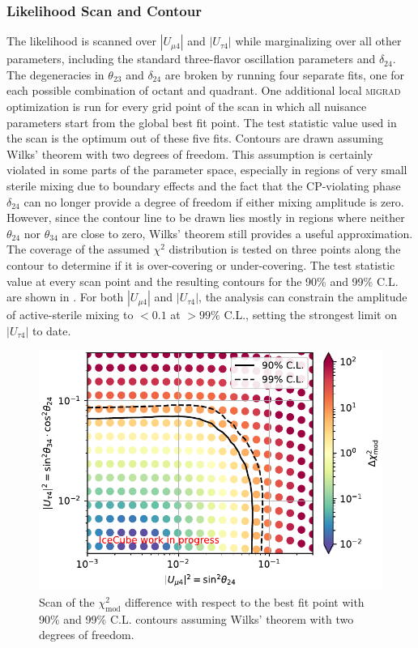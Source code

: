 \subsubsection{Likelihood Scan and Contour}
The likelihood is scanned over $|U_{\mu 4}|$ and $|U_{\tau 4}|$ while marginalizing over all other parameters, including the standard three-flavor oscillation parameters and $\delta_{24}$. The degeneracies in $\theta_{23}$ and $\delta_{24}$ are broken by running four separate fits, one for each possible combination of octant and quadrant. One additional local \textsc{migrad} optimization is run for every grid point of the scan in which all nuisance parameters start from the global best fit point. The test statistic value used in the scan is the optimum out of these five fits. Contours are drawn assuming Wilks' theorem with two degrees of freedom. This assumption is certainly violated in some parts of the parameter space, especially in regions of very small sterile mixing due to boundary effects and the fact that the CP-violating phase $\delta_{24}$ can no longer provide a degree of freedom if either mixing amplitude is zero. However, since the contour line to be drawn lies mostly in regions where neither $\theta_{24}$ nor $\theta_{34}$ are close to zero, Wilks' theorem still provides a useful approximation. The coverage of the assumed $\chi^2$ distribution is tested on three points along the contour to determine if it is over-covering or under-covering. The test statistic value at every scan point and the resulting contours for the 90\% and 99\% C.L. are shown in . For both $|U_{\mu 4}|$ and $|U_{\tau 4}|$, the analysis can constrain the amplitude of active-sterile mixing to $<0.1$ at $>99\%$ C.L., setting the strongest limit on $|U_{\tau 4}|$ to date. 

\begin{figure}
    \centering
    \includegraphics{figures/measurement/sterile_analysis/results/REAL_DATA_wilks_contours_merged_scans.pdf}
    \caption{Scan of the $\chi^2_{\mathrm{mod}}$ difference with respect to the best fit point with 90\% and 99\% C.L. contours assuming Wilks' theorem with two degrees of freedom.}
    \label{fig:sterile-contour-scan}
\end{figure}